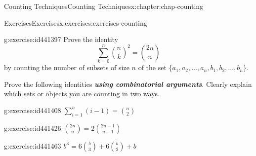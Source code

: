 \documentclass[oneside,10pt,]{book}
\newcommand{\alert}[1]{\textbf{\textit{#1}}}
\numberwithin{equation}{section}
\begin{document}
\begin{chapterptx}{Counting Techniques}{}{Counting Techniques}{}{}{x:chapter:chap-counting}
\begin{exercises-section}{Exercises}{}{Exercises}{}{}{x:exercises:exercises-counting}
\begin{divisionexercise}{25}{}{}{g:exercise:id441397}
Prove the identity%
\begin{equation*}
\sum_{k=0}^n \binom{n}{k}^2 = \binom{2n}{n}
\end{equation*}
by counting the number of subsets of size \(n\) of the set \(\{a_1,a_2,\ldots,a_n,b_1,b_2,\ldots,b_n\}\).%
\end{divisionexercise}%
\par\medskip\noindent%
%
Prove the following identities \alert{using combinatorial arguments}. Clearly explain which sets or objects you are counting in two ways.%
\begin{exercisegroup}
\begin{divisionexerciseeg}{26}{}{}{g:exercise:id441408}%
\(\displaystyle\sum_{i=1}^n (i-1) = \binom{n}{2}\)%
\end{divisionexerciseeg}%
\begin{divisionexerciseeg}{27}{}{}{g:exercise:id441426}%
\(\displaystyle\binom{2n}{n} = 2\binom{2n-1}{n-1}\)%
\end{divisionexerciseeg}%
\begin{divisionexerciseeg}{28}{}{}{g:exercise:id441463}%
\(\displaystyle b^3 = 6\binom{b}{3} + 6\binom{b}{2} + b\)%
\end{divisionexerciseeg}%
\end{exercisegroup}
\par\medskip\noindent
\end{exercises-section}
\end{chapterptx}
%
%
\typeout{************************************************}
\typeout{************************************************}
%
\end{document}
